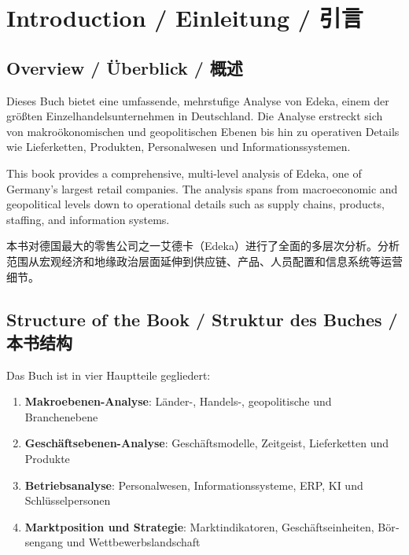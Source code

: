 \chapter{Introduction / Einleitung / 引言}

\section{Overview / Überblick / 概述}

\begin{otherlanguage}{ngerman}
Dieses Buch bietet eine umfassende, mehrstufige Analyse von Edeka, einem der größten Einzelhandelsunternehmen in Deutschland. Die Analyse erstreckt sich von makroökonomischen und geopolitischen Ebenen bis hin zu operativen Details wie Lieferketten, Produkten, Personalwesen und Informationssystemen.
\end{otherlanguage}

This book provides a comprehensive, multi-level analysis of Edeka, one of Germany's largest retail companies. The analysis spans from macroeconomic and geopolitical levels down to operational details such as supply chains, products, staffing, and information systems.

本书对德国最大的零售公司之一艾德卡（Edeka）进行了全面的多层次分析。分析范围从宏观经济和地缘政治层面延伸到供应链、产品、人员配置和信息系统等运营细节。

\section{Structure of the Book / Struktur des Buches / 本书结构}

\begin{otherlanguage}{ngerman}
Das Buch ist in vier Hauptteile gegliedert:
\begin{enumerate}
    \item \textbf{Makroebenen-Analyse}: Länder-, Handels-, geopolitische und Branchenebene
    \item \textbf{Geschäftsebenen-Analyse}: Geschäftsmodelle, Zeitgeist, Lieferketten und Produkte
    \item \textbf{Betriebsanalyse}: Personalwesen, Informationssysteme, ERP, KI und Schlüsselpersonen
    \item \textbf{Marktposition und Strategie}: Marktindikatoren, Geschäftseinheiten, Börsengang und Wettbewerbslandschaft
\end{enumerate}
\end{otherlanguage}

